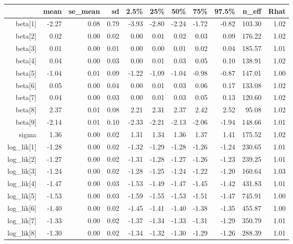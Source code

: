 \begin{table}[ht]
\centering
\begin{tabular}{rrrrrrrrrrr}
  \hline
 & mean & se\_mean & sd & 2.5\% & 25\% & 50\% & 75\% & 97.5\% & n\_eff & Rhat \\ 
  \hline
beta[1] & -2.27 & 0.08 & 0.79 & -3.93 & -2.80 & -2.24 & -1.72 & -0.82 & 103.30 & 1.02 \\ 
  beta[2] & 0.02 & 0.00 & 0.02 & 0.00 & 0.01 & 0.02 & 0.03 & 0.09 & 176.22 & 1.02 \\ 
  beta[3] & 0.01 & 0.00 & 0.01 & 0.00 & 0.00 & 0.01 & 0.02 & 0.04 & 185.57 & 1.01 \\ 
  beta[4] & 0.04 & 0.00 & 0.03 & 0.00 & 0.01 & 0.03 & 0.05 & 0.10 & 138.91 & 1.02 \\ 
  beta[5] & -1.04 & 0.01 & 0.09 & -1.22 & -1.09 & -1.04 & -0.98 & -0.87 & 147.01 & 1.00 \\ 
  beta[6] & 0.05 & 0.00 & 0.04 & 0.00 & 0.01 & 0.03 & 0.06 & 0.17 & 133.08 & 1.02 \\ 
  beta[7] & 0.04 & 0.00 & 0.03 & 0.00 & 0.01 & 0.03 & 0.05 & 0.13 & 120.60 & 1.02 \\ 
  beta[8] & 2.37 & 0.01 & 0.08 & 2.21 & 2.31 & 2.37 & 2.42 & 2.52 & 95.08 & 1.02 \\ 
  beta[9] & -2.14 & 0.01 & 0.10 & -2.33 & -2.21 & -2.13 & -2.06 & -1.94 & 148.66 & 1.01 \\ 
  sigma & 1.36 & 0.00 & 0.02 & 1.31 & 1.34 & 1.36 & 1.37 & 1.41 & 175.52 & 1.02 \\ 
  log\_lik[1] & -1.28 & 0.00 & 0.02 & -1.32 & -1.29 & -1.28 & -1.26 & -1.24 & 230.65 & 1.01 \\ 
  log\_lik[2] & -1.27 & 0.00 & 0.02 & -1.31 & -1.28 & -1.27 & -1.26 & -1.23 & 239.25 & 1.01 \\ 
  log\_lik[3] & -1.24 & 0.00 & 0.02 & -1.28 & -1.25 & -1.24 & -1.22 & -1.20 & 160.64 & 1.03 \\ 
  log\_lik[4] & -1.47 & 0.00 & 0.03 & -1.53 & -1.49 & -1.47 & -1.45 & -1.42 & 431.83 & 1.01 \\ 
  log\_lik[5] & -1.53 & 0.00 & 0.03 & -1.59 & -1.55 & -1.53 & -1.51 & -1.47 & 745.91 & 1.00 \\ 
  log\_lik[6] & -1.40 & 0.00 & 0.02 & -1.45 & -1.41 & -1.40 & -1.38 & -1.35 & 455.87 & 1.00 \\ 
  log\_lik[7] & -1.33 & 0.00 & 0.02 & -1.37 & -1.34 & -1.33 & -1.31 & -1.29 & 350.79 & 1.01 \\ 
  log\_lik[8] & -1.30 & 0.00 & 0.02 & -1.34 & -1.32 & -1.30 & -1.29 & -1.26 & 288.39 & 1.01 \\ 

\end{tabular}
\end{table}
